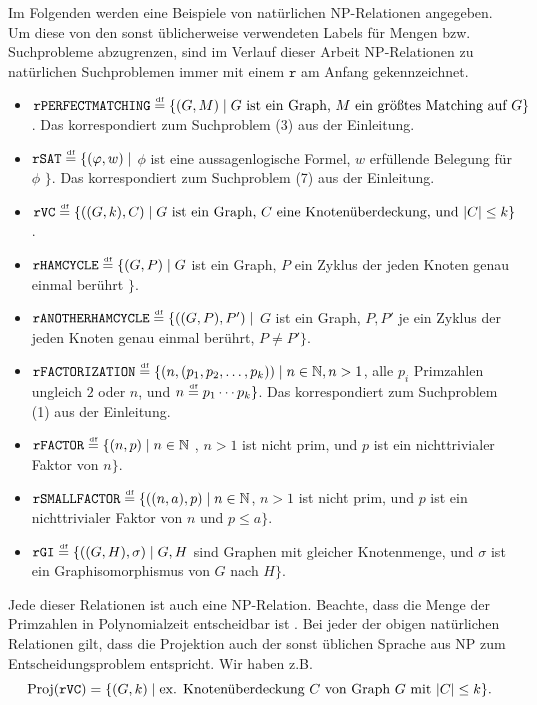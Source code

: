 Im Folgenden werden eine Beispiele von natürlichen NP-Relationen angegeben. Um diese von den sonst üblicherweise verwendeten Labels für Mengen bzw. Suchprobleme abzugrenzen, sind im Verlauf dieser Arbeit NP-Relationen zu natürlichen Suchproblemen immer mit einem $\mathtt{r}$ am Anfang gekennzeichnet.
\begin{itemize}[midpenalty=0]
\item $\mathtt{rPERFECTMATCHING} \stackrel{\text{\smash{\tiny df}}}{=} \{ (G, M) \mid \text{$G$ ist ein Graph, $M$ ein größtes Matching auf $G$} \}$. Das korrespondiert zum Suchproblem (3) aus der Einleitung.
\item $\mathtt{rSAT} \stackrel{\text{\smash{\tiny df}}}{=} \{ (\varphi, w) \mid $ $\phi$ ist eine aussagenlogische Formel, $w$ erfüllende Belegung für $\phi$ $\}$. Das korrespondiert zum Suchproblem (7) aus der Einleitung.
\item $\mathtt{rVC} \stackrel{\text{\smash{\tiny df}}}{=} \{ ((G, k), C) \mid \text{$G$ ist ein Graph, $C$ eine Knotenüberdeckung, und $|C|\leq k$} \}$.
\item $\mathtt{rHAMCYCLE} \stackrel{\text{\smash{\tiny df}}}{=} \{ (G, P) \mid G$ ist ein Graph, $P$ ein Zyklus der jeden Knoten genau einmal berührt $\}$.
\item $\mathtt{rANOTHERHAMCYCLE} \stackrel{\text{\smash{\tiny df}}}{=} \{ ((G, P), P') \mid $ $G$ ist ein Graph, $P, P'$ je ein Zyklus der jeden Knoten genau einmal berührt, $P\neq P' \}$.
\item $\mathtt{rFACTORIZATION} \stackrel{\text{\smash{\tiny df}}}{=} \{ (n, (p_1,p_2,\dots, p_k)) \mid n\in\mathbb N, n>1$, alle $p_i$ Primzahlen ungleich $2$ oder $n$, und $n\stackrel{\text{\smash{\tiny df}}}{=} p_1\cdots p_k \}$. Das korrespondiert zum Suchproblem (1) aus der Einleitung.
\item $\mathtt{rFACTOR} \stackrel{\text{\smash{\tiny df}}}{=} \{ (n, p) \mid n\in\mathbb N$ , $n>1$ ist nicht prim, und $p$ ist ein nichttrivialer Faktor von $n\}$.
\item $\mathtt{rSMALLFACTOR} \stackrel{\text{\smash{\tiny df}}}{=} \{ ((n, a), p) \mid n\in\mathbb N$, $n>1$ ist nicht prim, und $p$ ist ein nichttrivialer Faktor von $n$ und $p\leq a\}$.
\item $\mathtt{rGI} \stackrel{\text{\smash{\tiny df}}}{=} \{ ((G, H), \sigma) \mid G, H$ sind Graphen mit gleicher Knotenmenge, und $\sigma$ ist ein Graphisomorphismus von $G$ nach $H\}$.
\end{itemize}
Jede dieser Relationen ist auch eine NP-Relation. Beachte, dass die Menge der Primzahlen in Polynomialzeit entscheidbar ist \parencite{agrawal_primes_2004}.
Bei jeder der obigen natürlichen Relationen gilt, dass die Projektion auch der sonst üblichen Sprache aus NP zum Entscheidungsproblem entspricht. Wir haben z.B.
\[ \operatorname{Proj}(\mathtt{rVC}) = \{ (G, k) \mid \text{ex. Knotenüberdeckung $C$ von Graph $G$ mit $|C|\leq k$} \}. \]

